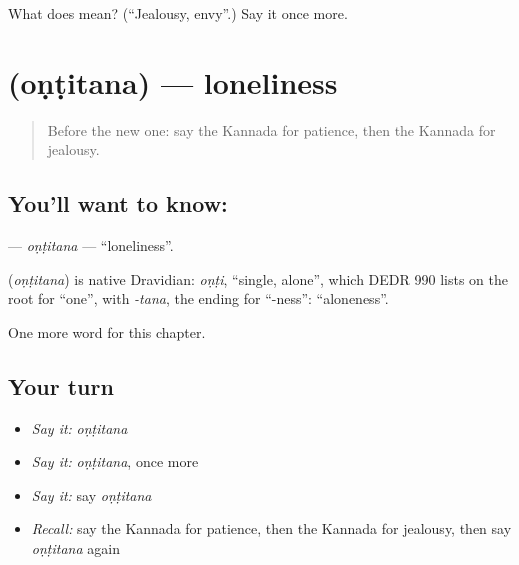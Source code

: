\begin{tcolorbox}[breakable,colback=teal!4,colframe=teal!35!black,title={Before you move on}]
What does  mean? (\textquotedblleft{}Jealousy, envy\textquotedblright{}.) Say it once more.
\end{tcolorbox}
\section[\texorpdfstring{\kn{ಒಂಟಿತನ} (oṇṭitana)}{ಒಂಟಿತನ (oṇṭitana)}]{ (oṇṭitana) — loneliness}

\label{lesson:KA-C169-ontitana}



\begin{quote}
Before the new one: say the Kannada for patience, then the Kannada for jealousy.
\end{quote}

\subsection*{You'll want to know: }
\textbf{} — \emph{oṇṭitana} — \textquotedblleft{}loneliness\textquotedblright{}.

\begin{cousinweb}
\textbf{} (\emph{oṇṭitana}) is native Dravidian: \emph{oṇṭi}, \textquotedblleft{}single, alone\textquotedblright{}, which DEDR 990 lists on the root for \textquotedblleft{}one\textquotedblright{}, with \emph{-tana}, the ending for \textquotedblleft{}-ness\textquotedblright{}: \textquotedblleft{}aloneness\textquotedblright{}.
\end{cousinweb}

\begin{grammarlens}[title={What you've built}]
One more word for this chapter.
\end{grammarlens}

\subsection*{Your turn}
\begin{itemize}
\raggedright
  \item \emph{Say it:} \emph{oṇṭitana}
  \item \emph{Say it:} \emph{oṇṭitana}, once more
  \item \emph{Say it:} say \emph{oṇṭitana}
  \item \emph{Recall:} say the Kannada for patience, then the Kannada for jealousy, then say \emph{oṇṭitana} again
\end{itemize}


